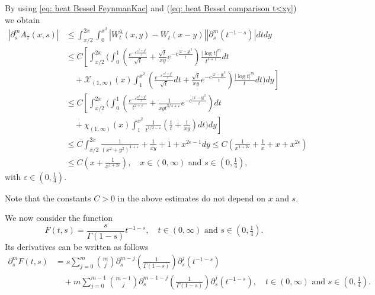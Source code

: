 \documentclass[a4paper,10pt, reqno]{amsart}
\theoremstyle{definition}
\theoremstyle{remark}
\numberwithin{equation}{section}
\begin{document}
 By using \eqref{eq: heat Bessel FeynmanKac} and (\ref{eq: heat Bessel comparison t<xy}) we obtain
\begin{align}\label{eq: proof Thm1.1 last term}
    |\partial_s^mA_7(x,s)|&\leq \int_{x/2}^{2x}\int_0^{x^2} |W_t^\lambda (x,y) -W_t(x-y)||\partial_s^m (t^{-1-s})|dtdy\nonumber\\
    &\leq C\left[\int_{x/2}^{2x}\Bigg(\int_0^1\left(\frac{e^{-c\frac{x^2+y^2}{t}}}{\sqrt{t}}+\frac{\sqrt{t}}{xy}e^{-c\frac{|x-y|^2}{t}}\right)\frac{|\log t|^m}{t^{s+1}}dt\right.\nonumber\\
    &\quad +\left.\mathcal X_{(1,\infty)}(x)\int_1^{x^2}\left(\frac{e^{-c\frac{x^2+y^2}{t}}}{\sqrt{t}}dt+\frac{\sqrt{t}}{xy}e^{-c\frac{|x-y|^2}{t}}\right)\frac{|\log t|^m}{t}dt\Bigg)dy\right]\nonumber\\
    &\leq C\left[\int_{x/2}^{2x}\Bigg(\int_0^1\left(\frac{e^{-c\frac{x^2+y^2}{t}}}{t^{2+\varepsilon}}+\frac{1}{xyt^{3/4+\varepsilon}}e^{-c\frac{|x-y|^2}{t}}\right)dt\right.\nonumber\\
    &\quad +\chi_{(1,\infty)}(x)\left.\int_1^{x^2}\frac{1}{t^{1/2-\varepsilon}}\left(\frac{1}{t}+\frac{1}{xy}\right)dt\Bigg)dy\right]\nonumber\\
    &\leq C\int_{x/2}^{2x}\frac{1}{(x^2+y^2)^{1+\varepsilon}}+\frac{1}{xy}+1+x^{2\epsilon-1}dy\leq C\left(\frac{1}{x^{1+2\varepsilon}}+\frac{1}{x}+x+x^{2\epsilon}\right)\nonumber\\
    &\leq C\left(x+\frac{1}{x^{1+2\varepsilon}}\right),\quad x\in (0,\infty)\mbox{ and }s\in \left(0,\tfrac{1}{4}\right),
\end{align}
with $\varepsilon \in (0,\tfrac14)$.

Note that the constants $C>0$ in the above estimates do not depend on $x$ and $s$.

We now consider the function 
\[
F(t,s)=\frac{s}{\Gamma (1-s)}t^{-1-s},\quad t\in (0,\infty)\mbox{ and }s\in \left(0,\tfrac{1}{4}\right).
\]
Its derivatives can be written as follows
\begin{align*}
    \partial_s^m F(t,s)&=s\sum_{j=0}^m\binom{m}{j}\partial_s^{m-j}\left(\frac{1}{\Gamma (1-s)}\right)\partial_s^j(t^{-1-s})\\
    &\quad +m\sum_{j=0}^{m-1}\binom{m-1}{j}\partial_s^{m-1-j}\left(\frac{1}{\Gamma (1-s)}\right)\partial_s^j(t^{-1-s}),\quad t\in (0,\infty)\mbox{ and }s\in \left(0,\tfrac{1}{4}\right).
\end{align*}
\end{document}
